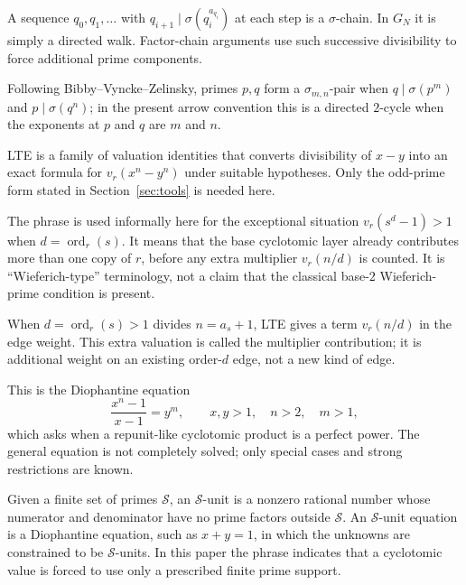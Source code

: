 \documentclass[11pt]{article}
\theoremstyle{definition}
\theoremstyle{remark}
\DeclareMathOperator{\ord}{ord}
\begin{document}
\begin{description}[style=nextline,leftmargin=1.5em]
\item[$\sigma$-chain or factor chain.]
A sequence $q_0,q_1,\ldots$ with
$q_{i+1}\mid\sigma(q_i^{a_{q_i}})$ at each step is a $\sigma$-chain.  In
$G_N$ it is simply a directed walk.  Factor-chain arguments use such
successive divisibility to force additional prime components.

\item[$\sigma_{m,n}$-pair.]
Following Bibby--Vyncke--Zelinsky, primes $p,q$ form a
$\sigma_{m,n}$-pair when
$q\mid\sigma(p^m)$ and $p\mid\sigma(q^n)$; in the present arrow convention
this is a directed $2$-cycle when the exponents at $p$ and $q$ are $m$ and
$n$.

\item[Lifting the exponent (LTE).]
LTE is a family of valuation identities that converts divisibility of
$x-y$ into an exact formula for $v_r(x^n-y^n)$ under suitable hypotheses.
Only the odd-prime form stated in Section~\ref{sec:tools} is needed here.

\item[Wieferich-type lifting.]
The phrase is used informally here for the exceptional situation
$v_r(s^d-1)>1$ when $d=\ord_r(s)$.  It means that the base cyclotomic layer
already contributes more than one copy of $r$, before any extra multiplier
$v_r(n/d)$ is counted.  It is ``Wieferich-type'' terminology, not a claim
that the classical base-$2$ Wieferich-prime condition is present.

\item[Multiplier contribution.]
When $d=\ord_r(s)>1$ divides $n=a_s+1$, LTE gives a term $v_r(n/d)$ in the
edge weight.  This extra valuation is called the multiplier contribution; it
is additional weight on an existing order-$d$ edge, not a new kind of edge.

\item[Nagell--Ljunggren equation.]
This is the Diophantine equation
\[
\frac{x^n-1}{x-1}=y^m,\qquad x,y>1,\quad n>2,\quad m>1,
\]
which asks when a repunit-like cyclotomic product is a perfect power.  The
general equation is not completely solved; only special cases and strong
restrictions are known.

\item[$S$-unit and $S$-unit equation.]
Given a finite set of primes $\mathcal S$, an $\mathcal S$-unit is a nonzero
rational number whose numerator and denominator have no prime factors outside
$\mathcal S$.  An $\mathcal S$-unit equation is a Diophantine equation, such
as $x+y=1$, in which the unknowns are constrained to be $\mathcal S$-units.
In this paper the phrase indicates that a cyclotomic value is forced to use
only a prescribed finite prime support.


\end{description}
\end{document}
